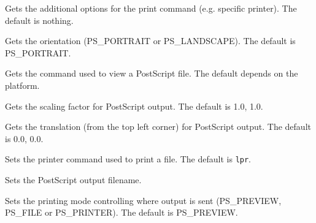 Gets the additional options for the print command (e.g. specific printer). The default is nothing.


\label{wxgetprinterorientation}


Gets the orientation (PS\_PORTRAIT or PS\_LANDSCAPE). The default is PS\_PORTRAIT.


\label{wxgetprinterpreviewcommand}


Gets the command used to view a PostScript file. The default depends on the platform.


\label{wxgetprinterscaling}


Gets the scaling factor for PostScript output. The default is 1.0, 1.0.


\label{wxgetprintertranslation}


Gets the translation (from the top left corner) for PostScript output. The default is 0.0, 0.0.


\label{wxsetprintercommand}


Sets the printer command used to print a file. The default is {\tt lpr}.


\label{wxsetprinterfile}


Sets the PostScript output filename.


\label{wxsetprintermode}


Sets the printing mode controlling where output is sent (PS\_PREVIEW, PS\_FILE or PS\_PRINTER).
The default is PS\_PREVIEW.


\label{wxsetprinteroptions}


